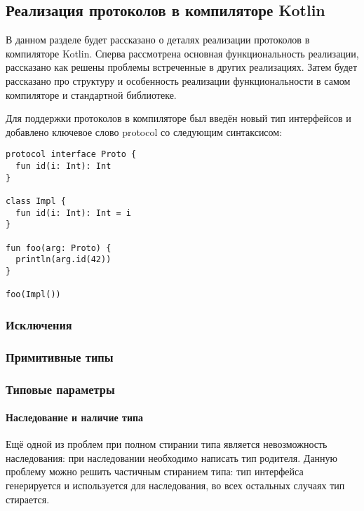 \subsection{Реализация протоколов в компиляторе Kotlin}
В данном разделе будет рассказано о деталях реализации протоколов в компиляторе Kotlin. Сперва рассмотрена основная функциональность реализации, рассказано как решены проблемы встреченные в других реализациях. Затем будет рассказано про структуру и особенность реализации функциональности в самом компиляторе и стандартной библиотеке.

Для поддержки протоколов в компиляторе был введён новый тип интерфейсов и добавлено ключевое слово protocol со следующим синтаксисом:

\begin{verbatim}
protocol interface Proto {
  fun id(i: Int): Int
}

class Impl {
  fun id(i: Int): Int = i
}

fun foo(arg: Proto) {
  println(arg.id(42))
}

foo(Impl())
\end{verbatim}


\subsubsection{Исключения}
\subsubsection{Примитивные типы}
\subsubsection{Типовые параметры}

\paragraph{Наследование и наличие типа}
Ещё одной из проблем при полном стирании типа является невозможность наследования: при наследовании необходимо написать тип родителя. Данную проблему можно решить частичным стиранием типа: тип интерфейса генерируется и используется для наследования, во всех остальных случаях тип стирается.

